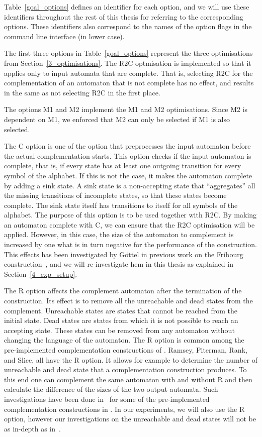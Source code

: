 Table~\ref{goal_options} defines an identifier for each option, and we will use these identifiers throughout the rest of this thesis for referring to the corresponding options. These identifiers also correspond to the names of the option flags in the command line interface (in lower case).

The first three options in Table~\ref{goal_options} represent the three optimisations from Section~\ref{3_optimisations}. The R2C optmisation is implemented so that it applies only to input automata that are complete. That is, selecting R2C for the complementation of an automaton that is not complete has no effect, and results in the same as not selecting R2C in the first place.

The options M1 and M2 implement the M1 and M2 optimisations. Since M2 is dependent on M1, we enforced that M2 can only be selected if M1 is also selected.

The C option is one of the option that preprocesses the input automaton before the actual complementation starts. This option checks if the input automaton is complete, that is, if every state has at least one outgoing transition for every symbol of the alphabet. If this is not the case, it makes the automaton complete by adding a sink state. A sink state is a non-accepting state that ``aggregates'' all the missing transitions of incomplete states, so that these states become complete. The sink state itself has transitions to itself for all symbols of the alphabet. The purpose of this option is to be used together with R2C. By making an automaton complete with C, we can ensure that the R2C optimisation will be applied. However, in this case, the size of the automaton to complement is increased by one what is in turn negative for the performance of the construction. This effects has been investigated by Göttel in previous work on the Fribourg construction~\cite{2013_bsc_goettel}, and we will re-investigate hem in this thesis as explained in Section~\ref{4_exp_setup}.

The R option affects the complement automaton after the termination of the construction. Its effect is to remove all the unreachable and dead states from the complement. Unreachable states are states that cannot be reached from the initial state. Dead states are states from which it is not possible to reach an accepting state. These states can be removed from any automaton without changing the language of the automaton. The R option is common among the pre-implemented complementation constructions of \goal. Ramsey, Piterman, Rank, and Slice, all have the R option. It allows for example to determine the number of unreachable and dead state that a complementation construction produces. To this end one can complement the same automaton with and without R and then calculate the difference of the sizes of the two output automata. Such investigations have been done in~\cite{2011_tsai} for some of the pre-implemented complementation constructions in \goal. In our experiments, we will also use the R option, however our investigations on the unreachable and dead states will not be as in-depth as in~\cite{2011_tsai}.

